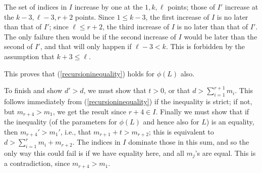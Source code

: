 \documentclass[12pt]{article}
\numberwithin{equation}{section}
\numberwithin{subeq}{equation}
\begin{document}
The set of indices in $I$ increase by one at the $1, k, \ell$ points;
those of $I'$ increase at the $k-3, \ell-3, r+2$ points.
Since $1 \leq k-3$, the first increase of $I$ is no later than that of $I'$;
since $\ell \leq r+2$, the third increase of $I$ is no later than that of $I'$.
The only failure then would be if the second increase of $I$ would be later than the second of $I'$, and that will only happen if $\ell-3 < k$.
This is forbidden by the assumption that $k+3 \leq \ell$.

This proves that (\ref{recursioninequality}) holds for $\phi(L)$ also.

To finish and show $d' > d$, we must show that $t >0$, or that
$d > \sum_{i=1}^{r+1} m_i$.  This follows immediately from (\ref{recursioninequality}) if the inequality is strict; if not, but $m_{r+4} > m_1$, we get the result since $r+4 \in I$.
Finally we must show that if the inequality
(of the parameters for $\phi(L)$ and hence also for $L$) is an equality,
then $m_{r+4}' > m_{1}'$, i.e., that $m_{r+1}+t > m_{r+2}$;
this is equivalent to $d > \sum_{i=1}^r m_i + m_{r+2}$.
The indices in $I$ dominate those in this sum, and so the only way this could fail is if
we have equality here, and all $m_j$'s are equal.
This is a contradiction, since $m_{r+4} > m_1$.

\end{document}
